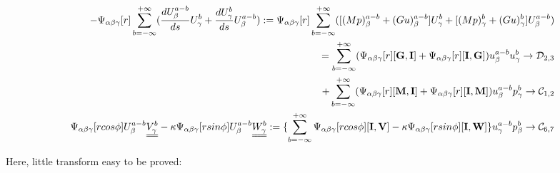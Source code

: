 \documentclass{Note}
\begin{document}
\begin{equation}
\begin{aligned}
-\Psi_{\alpha\beta\gamma}[r]\sum_{b=-\infty}^{+\infty}({{d U_\beta^{a-b} \over {d s}}U_\gamma^{b}}+{dU_\gamma^{b}\over ds}U_\beta^{a-b}):=\Psi_{\alpha\beta\gamma}[r]\sum_{b=-\infty}^{+\infty}([{(Mp)_\beta^{a-b}+(Gu)_\beta^{a-b}]U_\gamma^{b}}+[(Mp)_\gamma^{b}+(Gu)_\gamma^{b}]U_\beta^{a-b})\\
=\sum_{b=-\infty}^{+\infty}(\Psi_{\alpha\beta\gamma}[r][\textbf{G},\textbf{I}]+\Psi_{\alpha\beta\gamma}[r][\textbf{I},\textbf{G}])u_\beta^{a-b}u_\gamma^{b}\rightarrow \mathcal{D}_{2,3}\\
+\sum_{b=-\infty}^{+\infty}(\Psi_{\alpha\beta\gamma}[r][\textbf{M},\textbf{I}]+\Psi_{\alpha\beta\gamma}[r][\textbf{I},\textbf{M}])u_\beta^{a-b}p_\gamma^{b}\rightarrow\mathcal{C}_{1,2}\\
\Psi_{\alpha\beta\gamma}[rcos\phi]U_\beta^{a-b}\uuline{V_\gamma^b}-\kappa \Psi_{\alpha\beta\gamma}[r sin\phi]U_\beta^{a-b}\uuline{W_\gamma^b}:=\{\sum_{b=-\infty}^{+\infty} \Psi_{\alpha\beta\gamma}[rcos\phi][\textbf{I},\textbf{V}]-\kappa \Psi_{\alpha\beta\gamma}[r sin\phi][\textbf{I},\textbf{W}]\}u_\gamma^{a-b}p_\beta^{b}\rightarrow \mathcal{C}_{6,7}\\
\end{aligned}
\end{equation}

Here, little transform easy to be proved:
\end{document}
